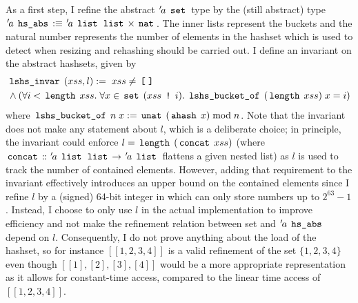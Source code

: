 As a first step, I refine the abstract ${\mskip2mu '\mskip-2mua} \; \,\text{\ttfamily set}\,$ type by the (still abstract) type ${\mskip2mu '\mskip-2mua} \; \,\text{\ttfamily hs\_abs}\, :\equiv {\mskip2mu '\mskip-2mua} \; \,\text{\ttfamily list}\, \; \,\text{\ttfamily list}\, \times \,\text{\ttfamily nat}\,$.
The inner lists represent the buckets and the natural number represents the number of elements in the hashset which is used to detect when resizing and rehashing should be carried out.
I define an invariant on the abstract hashsets, given by
\begin{align*}
	 & \,\text{\ttfamily lshs\_invar}\, \; (xss,l) := \; xss \neq \,\text{\ttfamily [\;]}\,                                                                                                                   \\
	 & \land (\forall i < \,\text{\ttfamily length}\, \; xss. \; \forall x \in \,\text{\ttfamily set}\, \; (xss \; \,\text{\ttfamily !}\, \; i). \; \,\text{\ttfamily lshs\_bucket\_of}\, \; (\,\text{\ttfamily length}\, \; xss) \; x = i)
\end{align*}
where $\,\text{\ttfamily lshs\_bucket\_of}\, \; n \; x := \,\text{\ttfamily unat}\, \; (\,\text{\ttfamily ahash}\, \; x) \; \text{mod} \; n$.
Note that the invariant does not make any statement about $l$, which is a deliberate choice; in principle, the invariant could enforce $l = \,\text{\ttfamily length}\, \; (\,\text{\ttfamily concat}\, \; xss)$ (where $\,\text{\ttfamily concat}\, \mathrel{\mathord{:}\mkern-1.2mu\mathord{:}} {\mskip2mu '\mskip-2mua} \; \,\text{\ttfamily list}\, \; \,\text{\ttfamily list}\, \rightarrow {\mskip2mu '\mskip-2mua} \; \,\text{\ttfamily list}\,$ flattens a given nested list) as $l$ is used to track the number of contained elements.
However, adding that requirement to the invariant effectively introduces an upper bound on the contained elements since I refine $l$ by a (signed) 64-bit integer in  which can only store numbers up to $2^{63}-1$.
Instead, I choose to only use $l$ in the actual implementation to improve efficiency and not make the refinement relation between set and ${\mskip2mu '\mskip-2mua} \; \,\text{\ttfamily hs\_abs}\,$ depend on $l$.
Consequently, I do not prove anything about the load of the hashset, so for instance $[[1,2,3,4]]$ is a valid refinement of the set $\{1,2,3,4\}$ even though $[[1],[2],[3],[4]]$ would be a more appropriate representation as it allows for constant-time access, compared to the linear time access of $[[1,2,3,4]]$.

